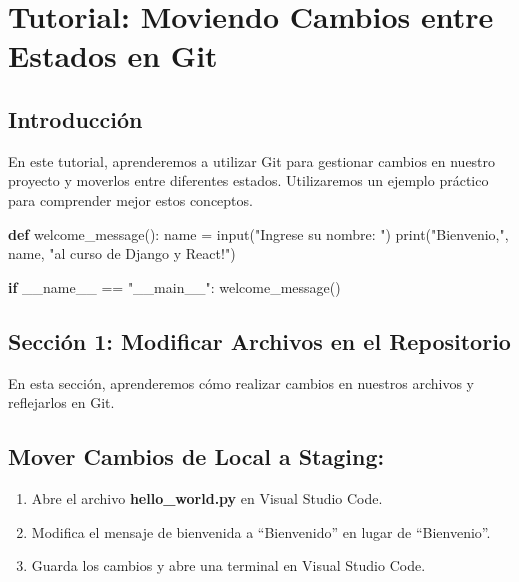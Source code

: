 \documentclass[
  a4paper,
  DIV=11,
  numbers=noendperiod,
  onepage,
  openany]{scrreprt}
\newenvironment{Shaded}{\begin{snugshade}}{\end{snugshade}}
\newcommand{\BuiltInTok}[1]{\textcolor[rgb]{0.00,0.23,0.31}{#1}}
\newcommand{\ControlFlowTok}[1]{\textcolor[rgb]{0.00,0.23,0.31}{\textbf{#1}}}
\newcommand{\KeywordTok}[1]{\textcolor[rgb]{0.00,0.23,0.31}{\textbf{#1}}}
\newcommand{\NormalTok}[1]{\textcolor[rgb]{0.00,0.23,0.31}{#1}}
\newcommand{\OperatorTok}[1]{\textcolor[rgb]{0.37,0.37,0.37}{#1}}
\newcommand{\StringTok}[1]{\textcolor[rgb]{0.13,0.47,0.30}{#1}}
\newcommand{\VariableTok}[1]{\textcolor[rgb]{0.07,0.07,0.07}{#1}}
\providecommand{\tightlist}{%
  \setlength{\itemsep}{0pt}\setlength{\parskip}{0pt}}\usepackage{longtable,booktabs,array}
\begin{document}
\chapter{Tutorial: Moviendo Cambios entre Estados en Git
📝}\label{tutorial-moviendo-cambios-entre-estados-en-git}

\section{Introducción}\label{introducciuxf3n}

En este tutorial, aprenderemos a utilizar Git para gestionar cambios en
nuestro proyecto y moverlos entre diferentes estados. Utilizaremos un
ejemplo práctico para comprender mejor estos conceptos.

\begin{Shaded}
\begin{Highlighting}[]
\KeywordTok{def}\NormalTok{ welcome\_message():}
\NormalTok{    name }\OperatorTok{=} \BuiltInTok{input}\NormalTok{(}\StringTok{"Ingrese su nombre: "}\NormalTok{)}
    \BuiltInTok{print}\NormalTok{(}\StringTok{"Bienvenio,"}\NormalTok{, name, }\StringTok{"al curso de Django y React!"}\NormalTok{)}

\ControlFlowTok{if} \VariableTok{\_\_name\_\_} \OperatorTok{==} \StringTok{"\_\_main\_\_"}\NormalTok{:}
\NormalTok{    welcome\_message()}
\end{Highlighting}
\end{Shaded}

\section{Sección 1: Modificar Archivos en el
Repositorio}\label{secciuxf3n-1-modificar-archivos-en-el-repositorio}

En esta sección, aprenderemos cómo realizar cambios en nuestros archivos
y reflejarlos en Git.

\section{Mover Cambios de Local a
Staging:}\label{mover-cambios-de-local-a-staging}

\begin{enumerate}
\def\labelenumi{\arabic{enumi}.}
\tightlist
\item
  Abre el archivo \textbf{hello\_world.py} en Visual Studio Code.
\item
  Modifica el mensaje de bienvenida a ``Bienvenido'' en lugar de
  ``Bienvenio''.
\item
  Guarda los cambios y abre una terminal en Visual Studio Code.
\end{enumerate}
\end{document}
